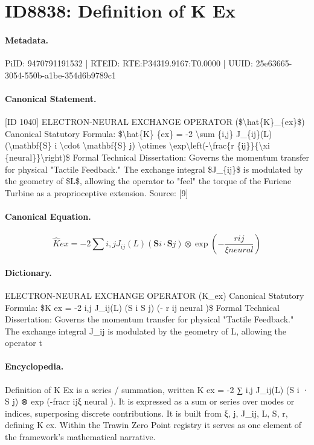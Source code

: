 \section*{ID8838: Definition of K Ex}
\paragraph{Metadata.}
PiID: 9470791191532 | RTEID: RTE:P34319.9167:T0.0000 | UUID: 25e63665-3054-550b-a1be-354d6b9789c1

\paragraph{Canonical Statement.}
[ID 1040] ELECTRON-NEURAL EXCHANGE OPERATOR (\$\textbackslash{}hat\{K\}\_\{ex\}\$) Canonical Statutory Formula: \$\textbackslash{}hat\{K\} \{ex\} = -2 \textbackslash{}sum \{i,j\} J\_\{ij\}(L) (\textbackslash{}mathbf\{S\} i \textbackslash{}cdot \textbackslash{}mathbf\{S\} j) \textbackslash{}otimes \textbackslash{}exp\textbackslash{}left(-\textbackslash{}frac\{r \{ij\}\}\{\textbackslash{}xi \{neural\}\}\textbackslash{}right)\$ Formal Technical Dissertation: Governs the momentum transfer for physical "Tactile Feedback." The exchange integral \$J\_\{ij\}\$ is modulated by the geometry of \$L\$, allowing the operator to "feel" the torque of the Furiene Turbine as a proprioceptive extension. Source: [9]

\paragraph{Canonical Equation.}
\[
\hat{K} {ex} = -2 \sum {i,j} J_{ij}(L) (\mathbf{S} i \cdot \mathbf{S} j) \otimes \exp\left(-\frac{r {ij}}{\xi {neural}}\right)
\]

\paragraph{Dictionary.}
ELECTRON-NEURAL EXCHANGE OPERATOR (K\_ex) Canonical Statutory Formula: \$K ex = -2 i,j J\_ij(L) (S i S j) (- r ij neural )\$ Formal Technical Dissertation: Governs the momentum transfer for physical "Tactile Feedback." The exchange integral J\_ij is modulated by the geometry of L, allowing the operator t

\paragraph{Encyclopedia.}
Definition of K Ex is a series / summation, written K ex = -2 ∑ i,j J\_ij(L) (S i · S j) ⊗ exp (-fracr ijξ neural ). It is expressed as a sum or series over modes or indices, superposing discrete contributions. It is built from ξ, j, J\_ij, L, S, r, defining K ex. Within the Trawin Zero Point registry it serves as one element of the framework's mathematical narrative.
